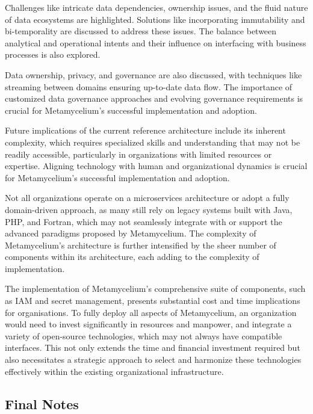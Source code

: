 \documentclass[journal]{IEEEtran}
\begin{document}
Challenges like intricate data dependencies, ownership issues, and the fluid nature of data ecosystems are highlighted. Solutions like incorporating immutability and bi-temporality are discussed to address these issues. The balance between analytical and operational intents and their influence on interfacing with business processes is also explored.

Data ownership, privacy, and governance are also discussed, with techniques like streaming between domains ensuring up-to-date data flow. The importance of customized data governance approaches and evolving governance requirements is crucial for Metamycelium's successful implementation and adoption.

Future implications of the current reference architecture include its inherent complexity, which requires specialized skills and understanding that may not be readily accessible, particularly in organizations with limited resources or expertise. Aligning technology with human and organizational dynamics is crucial for Metamycelium's successful implementation and adoption.

Not all organizations operate on a microservices architecture or adopt a fully domain-driven approach, as many still rely on legacy systems built with Java, PHP, and Fortran, which may not seamlessly integrate with or support the advanced paradigms proposed by Metamycelium. The complexity of Metamycelium's architecture is further intensified by the sheer number of components within its architecture, each adding to the complexity of implementation.

The implementation of Metamycelium's comprehensive suite of components, such as IAM and secret management, presents substantial cost and time implications for organisations. To fully deploy all aspects of Metamycelium, an organization would need to invest significantly in resources and manpower, and integrate a variety of open-source technologies, which may not always have compatible interfaces. This not only extends the time and financial investment required but also necessitates a strategic approach to select and harmonize these technologies effectively within the existing organizational infrastructure.

\subsection{Final Notes}
\end{document}

